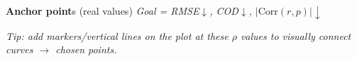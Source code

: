 \documentclass[aspectratio=169,10pt]{beamer}
\begin{document}
\begin{frame}{\frameK}
\begin{block}{  \footnotesize {} \textbf{Anchor point}s (real values) \;\; \textit{Goal = RMSE$\downarrow$, COD$\downarrow$, $|\mathrm{Corr}(r,p)|\downarrow$}}


\vspace{0.5mm}
\footnotesize
\textit{Tip: add markers/vertical lines on the plot at these $\rho$ values to visually connect curves $\rightarrow$ chosen points.}
\end{block}

\end{frame}
\end{document}
